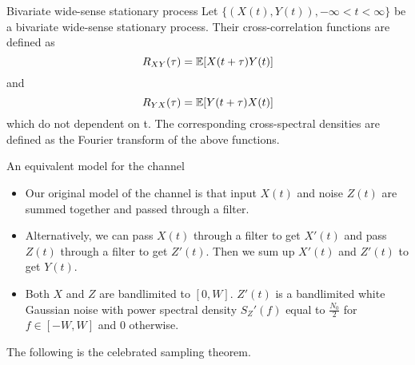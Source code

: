 \documentclass[../main.tex]{subfiles}
\begin{document}
\begin{gbox}{Bivariate wide-sense stationary process}
    Let $\{(X(t), Y(t)),-\infty < t <\infty\}$ be a bivariate wide-sense stationary process. Their cross-correlation functions are defined as \[
    R_{XY}(\tau) = \mathbb{E}[X(t+\tau)Y(t)]
    \] and \[
    R_{YX}(\tau) =\mathbb{E}[Y(t+\tau)X(t)]
    \] which do not dependent on t. The corresponding cross-spectral densities are defined as the Fourier transform of the above functions.
\end{gbox}
\begin{bbox}{An equivalent model for the channel}
    \begin{itemize}
        \item Our original model of the channel is that input $X(t)$ and noise $Z(t)$ are summed together and passed through a filter. 
        \item Alternatively, we can pass $X(t)$ through a filter to get $X'(t)$ and pass $Z(t)$ through a filter to get $Z'(t)$. Then we sum up $X'(t)$ and $Z'(t)$ to get $Y(t)$.
        \item Both $X$ and $Z$ are bandlimited to $[0,W]$. $Z'(t)$ is a bandlimited white Gaussian noise with power spectral density $S_Z'(f)$ equal to $\frac{N_0}{2}$ for $f\in[-W,W]$ and $0$ otherwise.
    \end{itemize}
\end{bbox}
The following is the celebrated sampling theorem.
\end{document}
